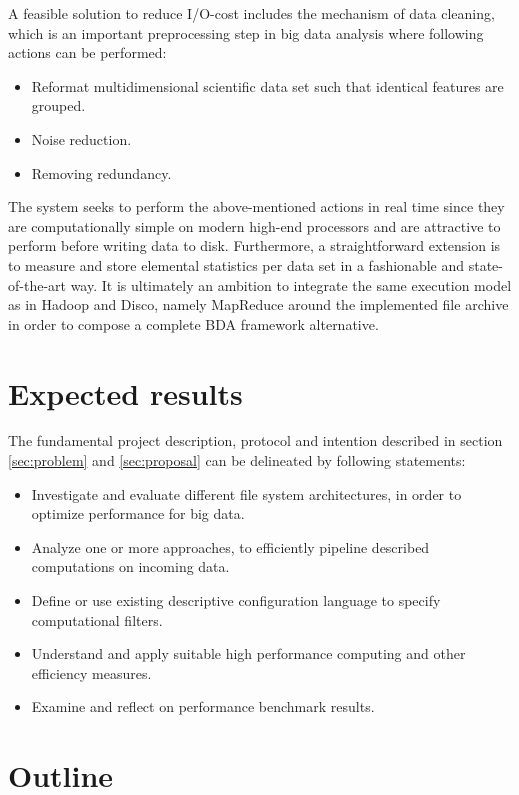A feasible solution to reduce I/O-cost includes the mechanism of data cleaning, which is an important preprocessing step in big data analysis where \ie following actions can be performed:
\vspace*{3mm}
\begin{itemize}
	\item Reformat multidimensional scientific data set such that identical features are grouped.
	\item Noise reduction.
	\item Removing redundancy.
\end{itemize}
\vspace*{3mm}

The system seeks to perform the above-mentioned actions in real time since they are computationally simple on modern high-end processors and are attractive to perform before writing data to disk. Furthermore, a straightforward extension is to measure and store elemental statistics per data set in a fashionable and state-of-the-art way. It is ultimately an ambition to integrate the same execution model as in \eg Hadoop and Disco, namely MapReduce around the implemented file archive in order to compose a complete BDA framework alternative.

\section{Expected results}
The fundamental project description, protocol and intention described in \eg section \ref{sec:problem} and \ref{sec:proposal} can be delineated by following statements:

\begin{itemize}
	\item Investigate and evaluate different file system architectures, in order to optimize performance for big data.	
	\item Analyze one or more approaches, to efficiently pipeline described computations on incoming data.
	\item Define or use existing descriptive configuration language to specify computational filters.
	\item Understand and apply suitable high performance computing and other efficiency measures.
	\item Examine and reflect on performance benchmark results.
\end{itemize}

\section{Outline}

